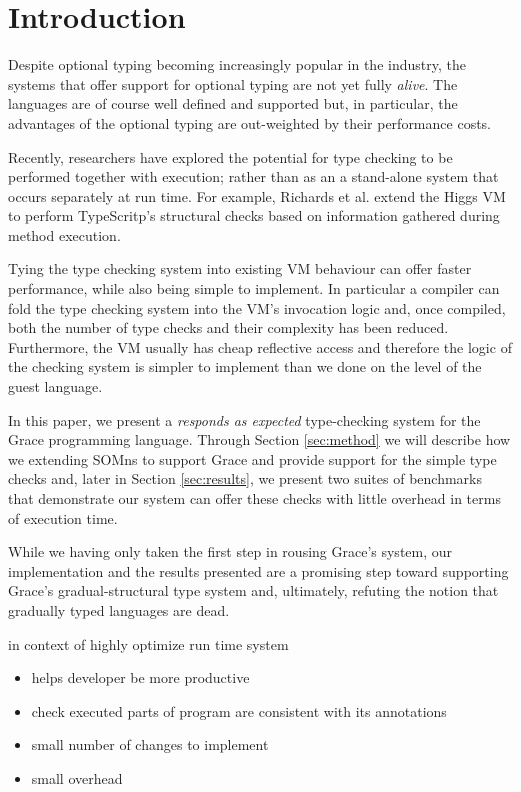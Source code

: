 \section{Introduction}
\label{sec:introduction}

Despite optional typing becoming increasingly popular in the industry, the systems that offer support for optional typing are not yet fully \emph{alive}. The languages are of course well defined and supported but, in particular, the advantages of the optional typing are out-weighted by their performance costs. 

Recently, researchers have explored the potential for type checking to be performed together with execution; rather than as an a stand-alone system that occurs separately at run time. For example, Richards et al. extend the Higgs VM to perform TypeScritp's structural checks based on information gathered during method execution. 

Tying the type checking system into existing VM behaviour can offer faster performance, while also being simple to implement. In particular a compiler can fold the type checking system into the VM's invocation logic and, once compiled, both the number of type checks and their complexity has been reduced. Furthermore, the VM usually has cheap reflective access and therefore the logic of the checking system is simpler to implement than we done on the level of the guest language.

In this paper, we present a \emph{responds as expected} type-checking system for the Grace programming language. Through Section \ref{sec:method} we will describe how we extending SOMns to support Grace and provide support for the simple type checks and, later in Section \ref{sec:results}, we present two suites of benchmarks that demonstrate our system can offer these checks with little overhead in terms of execution time.

While we having only taken the first step in rousing Grace's system, our implementation and the results presented are a promising step toward supporting Grace's gradual-structural type system and, ultimately, refuting the notion that gradually typed languages are dead.


in context of highly optimize run time system

\begin{itemize}
\item helps developer be more productive
\item check executed parts of program are consistent with its annotations
\item small number of changes to implement
\item small overhead
\end{itemize}